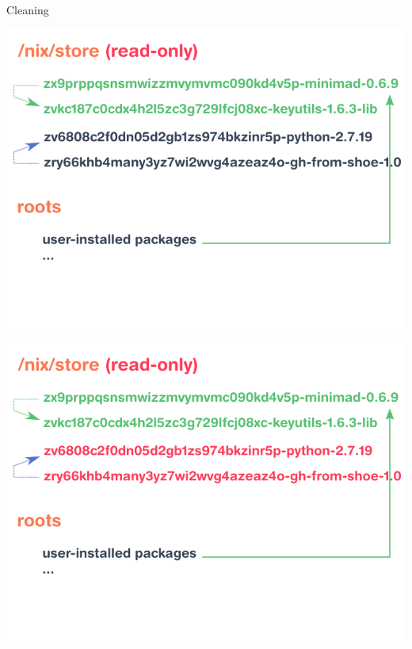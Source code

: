 \documentclass[aspectratio=169]{beamer}
\begin{document}
\begin{frame}{Cleaning}
{\begin{center}
            \includegraphics[height=0.98\textheight]{img/schema-nix-store-gc-v2-4-bis.pdf}
        \end{center}
    }
     {
        \begin{center}
            \includegraphics[height=0.98\textheight]{img/schema-nix-store-gc-v2-5.pdf}
        \end{center}
    }
     {
        \begin{center}

\end{center}}
\end{frame}
\end{document}
